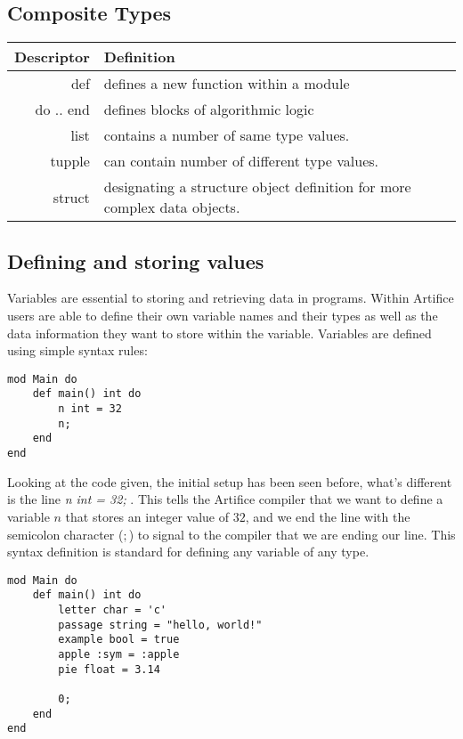 \documentclass{article}
\begin{document}
\subsection{Composite Types}
\begin{center}
\begin{tabular}{|r|l|}
	\hline
	Descriptor & Definition \\
	\hline
	\hline
	def & defines a new function within a module \\
	do .. end & defines blocks of algorithmic logic \\
	list & contains a number of same type values. \\
	tupple & can contain number of different type values. \\
	struct & designating a structure object definition for more complex data objects. \\
	\hline
\end{tabular}
\end{center}

\subsection{Defining and storing values}

Variables are essential to storing and retrieving data in programs. Within Artifice users are able to define their own variable names and their types
as well as the data information they want to store within the variable. Variables are defined using simple syntax rules:

\begin{lstlisting}
mod Main do
	def main() int do
		n int = 32
		n;
	end
end
\end{lstlisting}

Looking at the code given, the initial setup has been seen before, what's different is the line \textit{n int = 32;} . This tells the Artifice compiler that we want
to define a variable $n$ that stores an integer value of $32$, and we end the line with the semicolon character ($;$) to signal to the compiler that we are ending our
line. This syntax definition is standard for defining any variable of any type.

\begin{lstlisting}
mod Main do 
	def main() int do
		letter char = 'c'
		passage string = "hello, world!"
		example bool = true
		apple :sym = :apple
		pie float = 3.14

		0;
	end
end
\end{lstlisting}
\end{document}

